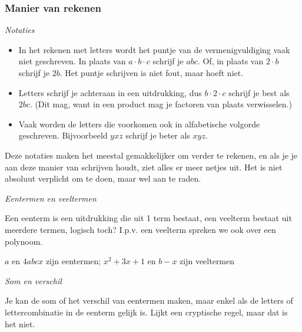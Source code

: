 \subsubsection{Manier van rekenen}

\emph{Notaties}

	\begin{itemize}
		\item In het rekenen met letters wordt het puntje van de vermenigvuldiging
		vaak niet geschreven. In plaats van $a\cdot b\cdot c$ schrijf je
		$abc$. Of, in plaats van $2\cdot b$ schrijf je $2b$. Het puntje
		schrijven is niet fout, maar hoeft niet.
		\item Letters schrijf je achteraan in een uitdrukking, dus $b\cdot2\cdot c$
		schrijf je best als $2bc$. (Dit mag, want in een product mag je factoren
		van plaats verwisselen.)
		\item Vaak worden de letters die voorkomen ook in alfabetische volgorde
		geschreven. Bijvoorbeeld $yxz$ schrijf je beter als $xyz$. 
	\end{itemize}
	Deze notaties maken het meestal gemakkelijker om verder
	te rekenen, en als je je aan deze manier van schrijven houdt, ziet
	alles er meer netjes uit. Het is niet absoluut verplicht om te doen,
	maar wel aan te raden.
	
	
	\emph{Eentermen en veeltermen}
	
	Een eenterm is een uitdrukking die uit 1 term bestaat, een veelterm
	bestaat uit meerdere termen, logisch toch? I.p.v. een veelterm spreken
	we ook over een polynoom.
	
	\begin{voorbeeld}
		$a$ en $4abcx$ zijn eentermen; $x^{2}+3x+1$ en $b-x$ zijn veeltermen
	\end{voorbeeld}
	
	\emph{Som en verschil}
	
	Je kan de som of het verschil van eentermen maken, maar enkel als
	de letters of lettercombinatie in de eenterm gelijk is. Lijkt een
	cryptische regel, maar dat is het niet. 
	
